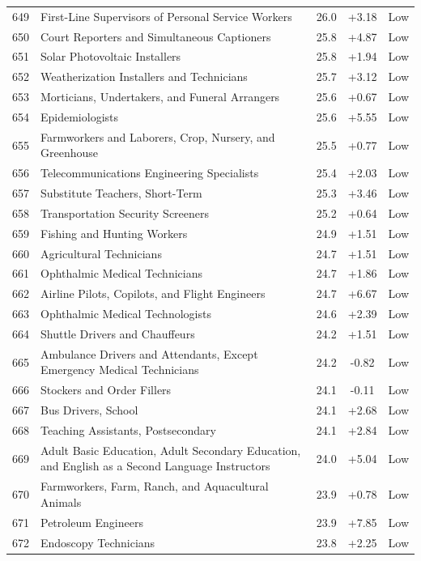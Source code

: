 {\begin{longtable}{rp{7cm}ccc}
649 & First-Line Supervisors of Personal Service Workers & 26.0 & +3.18 & Low \\
650 & Court Reporters and Simultaneous Captioners & 25.8 & +4.87 & Low \\
651 & Solar Photovoltaic Installers & 25.8 & +1.94 & Low \\
652 & Weatherization Installers and Technicians & 25.7 & +3.12 & Low \\
653 & Morticians, Undertakers, and Funeral Arrangers & 25.6 & +0.67 & Low \\
654 & Epidemiologists & 25.6 & +5.55 & Low \\
655 & Farmworkers and Laborers, Crop, Nursery, and Greenhouse & 25.5 & +0.77 & Low \\
656 & Telecommunications Engineering Specialists & 25.4 & +2.03 & Low \\
657 & Substitute Teachers, Short-Term & 25.3 & +3.46 & Low \\
658 & Transportation Security Screeners & 25.2 & +0.64 & Low \\
659 & Fishing and Hunting Workers & 24.9 & +1.51 & Low \\
660 & Agricultural Technicians & 24.7 & +1.51 & Low \\
661 & Ophthalmic Medical Technicians & 24.7 & +1.86 & Low \\
662 & Airline Pilots, Copilots, and Flight Engineers & 24.7 & +6.67 & Low \\
663 & Ophthalmic Medical Technologists & 24.6 & +2.39 & Low \\
664 & Shuttle Drivers and Chauffeurs & 24.2 & +1.51 & Low \\
665 & Ambulance Drivers and Attendants, Except Emergency Medical Technicians & 24.2 & -0.82 & Low \\
666 & Stockers and Order Fillers & 24.1 & -0.11 & Low \\
667 & Bus Drivers, School & 24.1 & +2.68 & Low \\
668 & Teaching Assistants, Postsecondary & 24.1 & +2.84 & Low \\
669 & Adult Basic Education, Adult Secondary Education, and English as a Second Language Instructors & 24.0 & +5.04 & Low \\
670 & Farmworkers, Farm, Ranch, and Aquacultural Animals & 23.9 & +0.78 & Low \\
671 & Petroleum Engineers & 23.9 & +7.85 & Low \\
672 & Endoscopy Technicians & 23.8 & +2.25 & Low \\

\end{longtable}}
